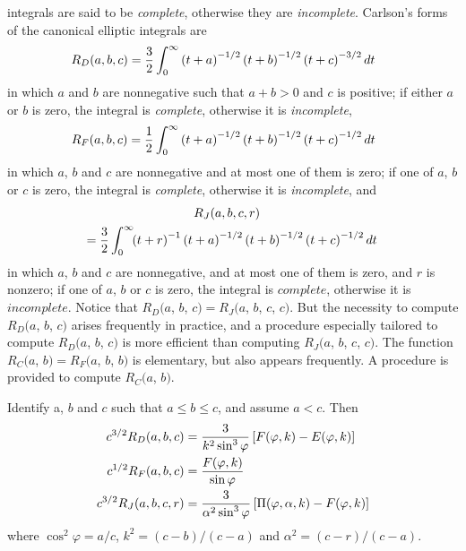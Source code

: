 \documentclass[twoside]{MATH77}
\begin{document}
integrals are said to be {\em complete}, otherwise they are {\em
incomplete}. Carlson's forms of the canonical elliptic integrals are
\begin{equation}\label{O5}
\hspace{-15pt}R_D(a,b,c)=\frac 32\int_0^\infty \left( t+a\right)
^{-1/2}\left( t+b\right) ^{-1/2}\left( t+c\right) ^{-3/2}dt
\end{equation}
in which $a$ and $b$ are nonnegative such that $a+b>0$ and $c$ is positive;
if either $a$ or $b$ is zero, the integral is {\em complete}, otherwise it is
{\em incomplete},
\begin{equation}\label{O6}
\hspace{-15pt}R_F(a,b,c)=\frac 12\int_0^\infty \left( t+a\right)
^{-1/2}\left( t+b\right) ^{-1/2}\left( t+c\right) ^{-1/2}dt
\end{equation}
in which $a$, $b$ and $c$ are nonnegative and at most one of them is zero;
if one of $a$, $b$ or $c$ is zero, the integral is {\em complete},
otherwise it is {\em incomplete}, and
\begin{multline}\label{O7}
\hspace{-10pt}R_J(a,b,c,r)\\
\hspace{-12pt}=\frac 32 \int_0^\infty \!\!\left( t+r\right)
^{-1}\left( t+a\right)^{-1/2}\left( t+b\right) ^{-1/2}\left( t+c\right)
^{-1/2}dt\hspace{-10pt}
\end{multline}
in which $a$, $b$ and $c$ are nonnegative, and at most one of them is zero,
and $r$ is nonzero; if one of $a$, $b$ or $c$ is zero, the integral is
$complete$, otherwise it is $incomplete$. Notice that $R_D(a$, $b$, $c)=R_J(a$, $%
b$, $c$, $c)$. But the necessity to compute $R_D(a$, $b$, $c)$ arises
frequently in practice, and a procedure especially tailored to compute $R_D(a
$, $b$, $c)$ is more efficient than computing $R_J(a$, $b$, $c$, $c)$. The
function $R_C(a$, $b)=R_F(a$, $b$, $b)$ is elementary, but also appears
frequently. A procedure is provided to compute $R_C(a$, $b).$

Identify a, $b$ and $c$ such that $a\leq b\leq c$, and assume $a<c$. Then
\begin{align}\label{O8}
c^{3/2}R_D(a,b,c)&=\frac 3{k^2\sin ^3\varphi }\left[ F(\varphi
,k)-E(\varphi ,k)\right]\hspace{-1in}\\
\label{O9}c^{1/2}R_F(a,b,c)&=\frac{F(\varphi ,k)}{\sin \varphi }\\
\label{O10}c^{3/2}R_J(a,b,c,r)&=\frac 3{\alpha ^2\sin ^3\varphi }\left[ \Pi
(\varphi ,\alpha ,k)-F(\varphi ,k)\right]
\end{align}
where $\cos ^2\varphi =a/c$, $k^2=(c-b)/(c-a)$ and $\alpha ^2=(c-r)/(c-a).$
\end{document}
